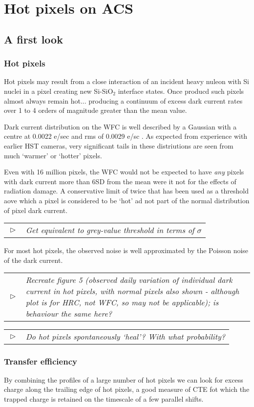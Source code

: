 \documentclass[10pt,fleqn]{article}
\renewcommand{\todo}[1]{
	\begin{minipage}{\textwidth}
	\textcolor{black}{
					\begin{tabular}{p{0.01\textwidth}p{0.95\textwidth}}
						$\vartriangleright$ & \textit{#1}
					\end{tabular}
					}
	\end{minipage}
}
\begin{document}
\section{Hot pixels on ACS}

\subsection{A first look \cite{ISR-0206}}


\subsubsection{Hot pixels}
Hot pixels may result from a close interaction of an incident heavy nuleon with Si nuclei in a pixel creating new Si-SiO$_2$ interface states. Once producd such pixels almost always remain hot... producing a continuum of excess dark current rates over 1 to 4 orders of magnitude greater than the mean value.

Dark current distribution on the WFC is well described by a Gaussian with a centre at 0.0022 e/sec and rms of 0.0029 e/sc . As expected from experience with earlier HST cameras, very significant tails in these distriutions are seen from much `warmer' or `hotter' pixels.

Even with 16 million pixels, the WFC would not be expected to have \emph{any} pixels with dark current more than 6SD from the mean were it not for the effects of radiation damage. A conservative limit of twice that has been used as a threshold aove which a pixel is considered to be `hot' ad not part of the normal distribution of pixel dark current.

\todo{Get equivalent to grey-value threshold in terms of $\sigma$}

For most hot pixels, the observed noise is well approximated by the Poisson noise of the dark current. 

\todo{Recreate figure 5 (observed daily variation of individual dark current in hot pixels, with normal pixels also shown - \emph{although plot is for HRC, not WFC, so may not be applicable}); is behaviour the same here?}

\todo{Do hot pixels spontaneously `heal'? With what probability?}


\subsubsection{Transfer efficiency}

By combining the profiles of a large number of hot pixels we can look for excess charge along the trailing edge of hot pixels, a good measure of CTE fot which the trapped charge is retained on the timescale of a few parallel shifts.
\end{document}
